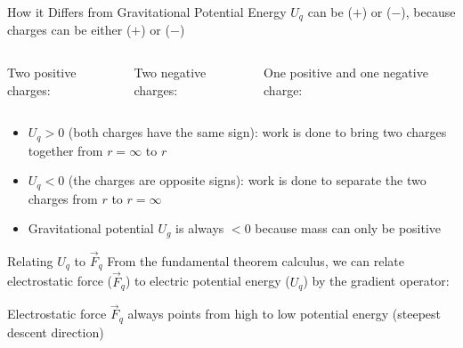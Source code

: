 \documentclass[12pt,aspectratio=169]{beamer}
\begin{document}
\begin{frame}{How it Differs from Gravitational Potential Energy}
  $U_q$ can be ($+$) or ($-$), because charges can be either ($+$) or ($-$)
 
  \vspace{.2in}
  \begin{columns}
    \centering
    Two positive charges:

    
    \centering
    Two negative charges:

    
    \centering
    One positive and one negative charge:

  \end{columns}
  \begin{itemize}
  \item $U_q>0$ (both charges have the same sign): work is done to bring two
    charges together from $r=\infty$ to $r$
  \item $U_q<0$ (the charges are opposite signs): work is done to separate the
    two charges from $r$ to $r=\infty$
  \item Gravitational potential $U_g$ is always $<0$ because mass can only be
    positive
  \end{itemize}
\end{frame}



\begin{frame}{Relating $U_q$ to $\vec F_q$}
  From the fundamental theorem calculus, we can relate electrostatic force
  ($\vec F_q$) to electric potential energy ($U_q$) by the gradient operator:


  Electrostatic force $\vec F_q$ always points from high to low potential
  energy (steepest descent direction)
\end{frame}
\end{document}
